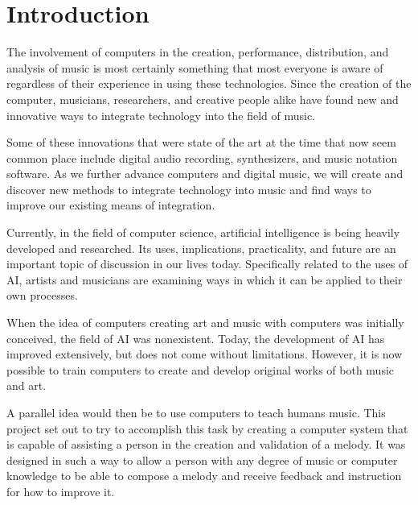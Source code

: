 \chapter{Introduction}
\label{ch:introduction}

The involvement of computers in the creation, performance, distribution, and analysis of music is most certainly something that most everyone is aware of regardless of their experience in using these technologies.  Since the creation of the computer, musicians, researchers, and creative people alike have found new and innovative ways to integrate technology into the field of music.

\vspace{\baselineskip}

Some of these innovations that were state of the art at the time that now seem common place include digital audio recording, synthesizers, and music notation software.  As we further advance computers and digital music, we will create and discover new methods to integrate technology into music and find ways to improve our existing means of integration.

\vspace{\baselineskip}

Currently, in the field of computer science, artificial intelligence is being heavily developed and researched.  Its uses, implications, practicality, and future are an important topic of discussion in our lives today.  Specifically related to the uses of AI, artists and musicians are examining ways in which it can be applied to their own processes.

\vspace{\baselineskip}

When the idea of computers creating art and music with computers was initially conceived, the field of AI was nonexistent.  Today, the development of AI has improved extensively, but does not come without limitations.  However, it is now possible to train computers to create and develop original works of both music and art.

\vspace{\baselineskip}

A parallel idea would then be to use computers to teach humans music.  This project set out to try to accomplish this task by creating a computer system that is capable of assisting a person in the creation and validation of a melody.  It was designed in such a way to allow a person with any degree of music or computer knowledge to be able to compose a melody and receive feedback and instruction for how to improve it.

